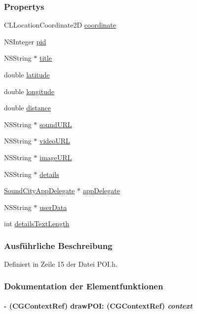 \subsubsection*{Propertys}
\begin{DoxyCompactItemize}
\item 
CLLocationCoordinate2D \hyperlink{interface_p_o_i_a63afb07b66c43a26aa58ab7759c4f473}{coordinate}
\item 
NSInteger \hyperlink{interface_p_o_i_a5bfdf0412280b12e34c4fb6e2e1a2db9}{pid}
\item 
NSString $\ast$ \hyperlink{interface_p_o_i_ae9808e7121230ffff42a799a6dec00e8}{title}
\item 
double \hyperlink{interface_p_o_i_af441df0d8c3d29174ca644414856d497}{latitude}
\item 
double \hyperlink{interface_p_o_i_a11947092f2cf76ac7b5ecd2678a376da}{longitude}
\item 
double \hyperlink{interface_p_o_i_a90eb704b40c5beca89e7461f3c9fd8ff}{distance}
\item 
NSString $\ast$ \hyperlink{interface_p_o_i_aac5100d218d6107bdb9b0a355289c55c}{soundURL}
\item 
NSString $\ast$ \hyperlink{interface_p_o_i_a0ee15b163f9aea00a479cfc65cc34091}{videoURL}
\item 
NSString $\ast$ \hyperlink{interface_p_o_i_af6c6d3845244e4d0608a3782be8dd077}{imageURL}
\item 
NSString $\ast$ \hyperlink{interface_p_o_i_a0b6bb6f1128c8cf4af2edd5fd47940fe}{details}
\item 
\hyperlink{interface_sound_city_app_delegate}{SoundCityAppDelegate} $\ast$ \hyperlink{interface_p_o_i_a9551f023faddf40afad4e8b9f5d87c77}{appDelegate}
\item 
NSString $\ast$ \hyperlink{interface_p_o_i_adccc1e600d247ec2e4a8a5bb241ed719}{userData}
\item 
int \hyperlink{interface_p_o_i_a22b3633a4bf768953ce7865cefa5430d}{detailsTextLength}
\end{DoxyCompactItemize}


\subsubsection{Ausführliche Beschreibung}


Definiert in Zeile 15 der Datei POI.h.

\subsubsection{Dokumentation der Elementfunktionen}
\hypertarget{interface_p_o_i_a40163280cbdbb8ec60a6a00fcd6babbe}{
\paragraph[{drawPOI:}]{\setlength{\rightskip}{0pt plus 5cm}-\/ (CGContextRef) drawPOI: (CGContextRef) {\em context}}\hfill}
\label{interface_p_o_i_a40163280cbdbb8ec60a6a00fcd6babbe}


